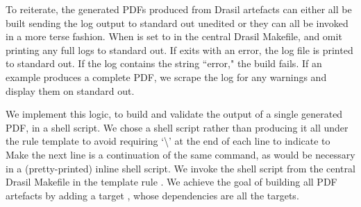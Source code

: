 {{{{{To reiterate, the generated PDFs produced from Drasil artefacts can either all be built sending the log output to standard out unedited or they can all be invoked in a more terse fashion. When  is set to  in the central Drasil Makefile,  and  omit printing any full logs to standard out. If  exits with an error, the log file is printed to standard out. If the  log contains the string ``error," the build fails. If an example produces a complete PDF, we scrape the  log for any warnings and display them on standard out. 

We implement this logic, to build and validate the output of a single generated PDF, in a shell script. We chose a shell script rather than producing it all under the  rule template to avoid requiring `\textbackslash' at the end of each line to indicate to Make the next line is a continuation of the same command, as would be necessary in a (pretty-printed) inline shell script. We invoke the shell script from the central Drasil Makefile in the template rule . We achieve the goal of building all PDF artefacts by adding a target , whose dependencies are all the  targets.


% 
% 

}}}}}
